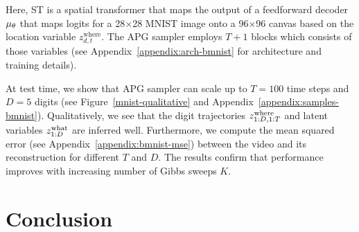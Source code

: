 \documentclass[anonymous=false, %
               format=acmsmall, %
               review=true, %
               screen=true, %
               nonacm=true]{acmart}
\theoremstyle{definition}
\begin{document}
Here, ST is a spatial transformer \cite{jaderberg2015spatial} that maps the output of a feedforward decoder $\mu_\theta$ that maps logits for a 28$\times$28 MNIST image onto a 96$\times$96 canvas based on the location variable $z^{\mathrm{where}}_{d, t}$. The APG sampler employs $T+1$ blocks which consists of those variables (see Appendix~\ref{appendix:arch-bmnist} for architecture and training details).

At test time, we show that APG sampler can scale up to $T=100$ time steps and $D=5$ digits (see Figure~\ref{mnist-qualitative} and Appendix~\ref{appendix:samples-bmnist}). Qualitatively, we see that the digit trajectories $z_{1:D, 1:T}^{\mathrm{where}}$ and latent variables $z_{1:D}^{\mathrm{what}}$ are inferred well.
Furthermore, we compute the mean squared error (see Appendix~\ref{appendix:bmnist-mse}) between the video and its reconstruction for different $T$ and $D$. The results confirm that performance improves with increasing number of Gibbs sweeps $K$.
\section{Conclusion}

\end{document}
